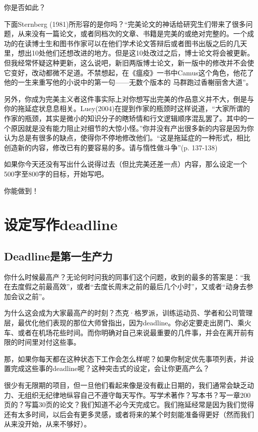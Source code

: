 \documentclass{ctexart}
\begin{document}
你是否如此？

下面Sternberg (1981)所形容的是你吗？“完美论文的神话给研究生们带来了很多问题，从来没有一篇论文，或者同档次的文章、书籍是完美的或绝对完整的。一个成功的在读博士生和图书作家可以在他们学术论文答辩后或者图书出版之后的几天里，想出10处他们还想改进的地方。但是这10处改过之后，博士论文将会被更新。但我经常怀疑这种更新，这么说吧，新旧两版博士论文，新一版中的修改并不会使它变好，改动都微不足道。不禁想起，在《瘟疫》一书中Camus这个角色，他花了他的一生来重写他的小说中的第一句——无数个版本的 马群跑过香榭丽舍大道”。

另外，你成为完美主义者这件事实际上对你想写出完美的作品意义并不大，倒是与你的拖延症状息息相关。Luey(2004)在提到作家的瓶颈时这样说道，“大家所谓的作家的瓶颈，其实是微小的知识分子的瞎矫情和行文逻辑顺序混乱罢了。其中的一个原因就是没有能力阻止对细节的大惊小怪。”你并没有产出很多新的内容是因为你认为总是有很多的缺点，使得你不停地修改他们。“这是拖延症的一种形式，相比创造新的内容，修改已有的要容易的多。请与惰性做斗争”(p. 137-138)

如果你今天还没有写出什么说得过去（但比完美还差一点）内容，那么设定一个500字至800字的目标，开始写吧。

你能做到！

\section{​设定写作deadline}
\subsection{Deadline是第一生产力}

你什么时候最高产？无论何时问我的同事们这个问题，收到的最多的答案是：“我在去度假之前最高效”，或者“去度长周末之前的最后几个小时”，又或者“动身去参加会议之前”。

为什么这会成为大家最高产的时刻？杰克·格罗派，训练运动员、学者和公司管理层，最优化他们表现的那位大师曾指出，因为deadline。你必定要走出房门、乘火车、或者在机场花些时间。而你明确对自己来说最重要的几件事，并会在离开前有限的时间里对付这些事。

那，如果你每天都在这种状态下工作会怎么样呢？如果你制定优先事项列表，并设置完成这些事的deadline呢？这种突击式的设定，会让你更高产么？

很少有无限期的项目，但一旦他们看起来像是没有截止日期的，我们通常会缺乏动力、无组织无纪律地纵容自己不遵守每天写作。写学术著作？写本书？写一章200页的？写篇30页的论文？我们知道不必今天完成它。我们拖延经常是因为我们觉得还有太多时间，以后会有更多灵感，或者将来的某个时刻能准备得更好（然而我们从来没开始，从来不够好）。
\end{document}
